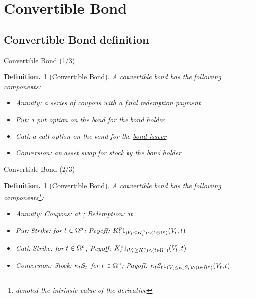 \documentclass{beamer}
\newtheorem{defn}[thm]{Definition.}
\begin{document}


\section{Convertible Bond} %


\subsection{Convertible Bond definition}

\begin{frame}{Convertible Bond (1/3)}
\begin{defn}[Convertible Bond]
A convertible bond has the following components:
\begin{itemize}
 \item \emph{Annuity:} a series of coupons with a final redemption payment
 \item \emph{Put:} a put option on the bond for the \underline{bond holder}
 \item \emph{Call:} a call option on the bond for the \underline{bond issuer}
 \item \emph{Conversion:} an asset swap for stock by the \underline{bond holder}
\end{itemize}
\end{defn}
\end{frame}

\begin{frame}{Convertible Bond (2/3)}
\begin{defn}[Convertible Bond]
A convertible bond has the following components\footnote{\V denoted the intrinsic value of the derivative}:
\begin{itemize}
 \item \emph{Annuity:} Coupons: \C at \ti; Redemption: \R at \T
 \item \emph{Put:} Strike: \Kp for $t \in \Omega^{p}$; Payoff: $K^{p}_t 1_{(V_t \le K^{p}_t)\wedge(t \in \Omega^{p})}(V_t, t)$
 \item \emph{Call:} Strike: \Kc for $t \in \Omega^{c}$; Payoff: $K^{c}_t 1_{(V_t \ge K^{c}_t)\wedge(t \in \Omega^{c})}(V_t, t)$
 \item \emph{Conversion:} Stock: $\kappa_tS_t$ for $t \in \Omega^{v}$; Payoff: $\kappa_tS_t 1_{(V_t \le \kappa_tS_t)\wedge(t \in \Omega^{v})}(V_t, t)$
\end{itemize}
\end{defn}
\end{frame}
\end{document}

